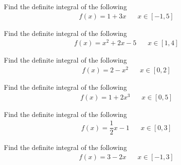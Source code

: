 \begin{exercise}
Find the definite integral of the following
\begin{align*}
    f(x) = 1 + 3x \hspace{20pt} x \in [-1, 5]
\end{align*}
\end{exercise}

\begin{exercise}
Find the definite integral of the following
\begin{align*}
    f(x) = x^{2} + 2x - 5 \hspace{20pt} x \in [1, 4]
\end{align*}
\end{exercise}

\begin{exercise}
Find the definite integral of the following
\begin{align*}
    f(x) = 2 - x^{2} \hspace{20pt} x \in [0, 2]
\end{align*}
\end{exercise}

\begin{exercise}
Find the definite integral of the following
\begin{align*}
    f(x) = 1 + 2x^{3} \hspace{20pt} x \in [0, 5]
\end{align*}
\end{exercise}

\begin{exercise}
Find the definite integral of the following
\begin{align*}
    f(x) = \dfrac{1}{2}x - 1 \hspace{20pt} x \in [0, 3]
\end{align*}
\end{exercise}

\begin{exercise}
Find the definite integral of the following
\begin{align*}
    f(x) = 3 - 2x \hspace{20pt} x \in [-1, 3]
\end{align*}
\end{exercise}

